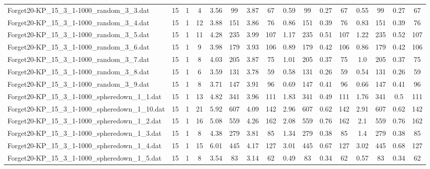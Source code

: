 \begin{sidewaystable}[!ht]
{\begin{tabular}{lccccccccccccccc}
Forget20-KP\_15\_3\_1-1000\_random\_3\_3.dat & 15 & 1 & 4 & 3.56 & 99 & 3.87 & 67 & 0.59 & 99 &  \textcolor{blue2}{0.27} & 67 & 0.55 & 99 &  \textcolor{blue2}{0.27} & 67 \\
Forget20-KP\_15\_3\_1-1000\_random\_3\_4.dat & 15 & 1 & 12 & 3.88 & 151 & 3.86 & 76 & 0.86 & 151 & 0.39 & 76 & 0.83 & 151 & 0.39 & 76 \\
Forget20-KP\_15\_3\_1-1000\_random\_3\_5.dat & 15 & 1 & 11 & 4.28 & 235 & 3.99 & 107 & 1.17 & 235 &  \textcolor{blue2}{0.51} & 107 & 1.22 & 235 & 0.52 & 107 \\
Forget20-KP\_15\_3\_1-1000\_random\_3\_6.dat & 15 & 1 & 9 & 3.98 & 179 & 3.93 & 106 & 0.89 & 179 &  \textcolor{blue2}{0.42} & 106 & 0.86 & 179 &  \textcolor{blue2}{0.42} & 106 \\
Forget20-KP\_15\_3\_1-1000\_random\_3\_7.dat & 15 & 1 & 8 & 4.03 & 205 & 3.87 & 75 & 1.01 & 205 &  \textcolor{blue2}{0.37} & 75 & 1.0 & 205 &  \textcolor{blue2}{0.37} & 75 \\
Forget20-KP\_15\_3\_1-1000\_random\_3\_8.dat & 15 & 1 & 6 & 3.59 & 131 & 3.78 & 59 & 0.58 & 131 &  \textcolor{blue2}{0.26} & 59 & 0.54 & 131 &  \textcolor{blue2}{0.26} & 59 \\
Forget20-KP\_15\_3\_1-1000\_random\_3\_9.dat & 15 & 1 & 8 & 3.71 & 147 & 3.91 & 96 & 0.69 & 147 &  \textcolor{blue2}{0.41} & 96 & 0.66 & 147 &  \textcolor{blue2}{0.41} & 96 \\
Forget20-KP\_15\_3\_1-1000\_spheredown\_1\_1.dat & 15 & 1 & 13 & 4.82 & 341 & 3.96 & 111 & 1.83 & 341 &  \textcolor{blue2}{0.49} & 111 & 1.76 & 341 & 0.5 & 111 \\
Forget20-KP\_15\_3\_1-1000\_spheredown\_1\_10.dat & 15 & 1 & 21 & 5.92 & 607 & 4.09 & 142 & 2.96 & 607 &  \textcolor{blue2}{0.62} & 142 & 2.91 & 607 &  \textcolor{blue2}{0.62} & 142 \\
Forget20-KP\_15\_3\_1-1000\_spheredown\_1\_2.dat & 15 & 1 & 16 & 5.08 & 559 & 4.26 & 162 & 2.08 & 559 & 0.76 & 162 & 2.1 & 559 & 0.76 & 162 \\
Forget20-KP\_15\_3\_1-1000\_spheredown\_1\_3.dat & 15 & 1 & 8 & 4.38 & 279 & 3.81 & 85 & 1.34 & 279 & 0.38 & 85 & 1.4 & 279 & 0.38 & 85 \\
Forget20-KP\_15\_3\_1-1000\_spheredown\_1\_4.dat & 15 & 1 & 15 & 6.01 & 445 & 4.17 & 127 & 3.01 & 445 &  \textcolor{blue2}{0.67} & 127 & 3.02 & 445 & 0.68 & 127 \\
Forget20-KP\_15\_3\_1-1000\_spheredown\_1\_5.dat & 15 & 1 & 8 & 3.54 & 83 & 3.14 & 62 & 0.49 & 83 & 0.34 & 62 & 0.57 & 83 & 0.34 & 62 \\

\end{tabular}}
\end{sidewaystable}
